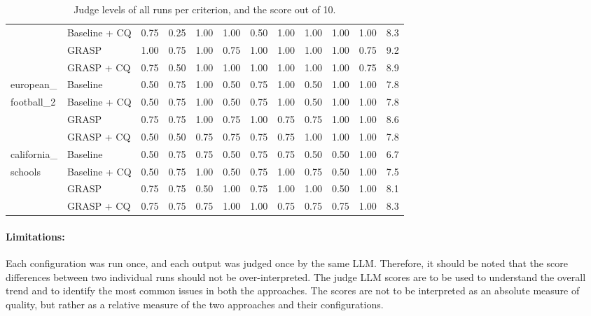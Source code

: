 \begin{table}[!htbp]
\begin{tabular}{l l c c c c c c c c c c}
               & Baseline + CQ & 0.75 & 0.25 & 1.00 & 1.00 & 0.50 & 1.00 & 1.00 & 1.00 & 1.00 & 8.3 \\
               & GRASP         & 1.00 & 0.75 & 1.00 & 0.75 & 1.00 & 1.00 & 1.00 & 1.00 & 0.75 & 9.2 \\
               & GRASP + CQ    & 0.75 & 0.50 & 1.00 & 1.00 & 1.00 & 1.00 & 1.00 & 1.00 & 0.75 & 8.9 \\
    \hline
    european\_  & Baseline      & 0.50 & 0.75 & 1.00 & 0.50 & 0.75 & 1.00 & 0.50 & 1.00 & 1.00 & 7.8 \\
    football\_2 & Baseline + CQ & 0.50 & 0.75 & 1.00 & 0.50 & 0.75 & 1.00 & 0.50 & 1.00 & 1.00 & 7.8 \\
               & GRASP         & 0.75 & 0.75 & 1.00 & 0.75 & 1.00 & 0.75 & 0.75 & 1.00 & 1.00 & 8.6 \\
               & GRASP + CQ    & 0.50 & 0.50 & 0.75 & 0.75 & 0.75 & 0.75 & 1.00 & 1.00 & 1.00 & 7.8 \\
    \hline
    california\_ & Baseline      & 0.50 & 0.75 & 0.75 & 0.50 & 0.75 & 0.75 & 0.50 & 0.50 & 1.00 & 6.7 \\
    schools    & Baseline + CQ & 0.50 & 0.75 & 1.00 & 0.50 & 0.75 & 1.00 & 0.75 & 0.50 & 1.00 & 7.5 \\
               & GRASP         & 0.75 & 0.75 & 0.50 & 1.00 & 0.75 & 1.00 & 1.00 & 0.50 & 1.00 & 8.1 \\
               & GRASP + CQ    & 0.75 & 0.75 & 0.75 & 1.00 & 1.00 & 0.75 & 0.75 & 0.75 & 1.00 & 8.3 \\
    \hline
  \end{tabular}
  \caption[Judge levels of all runs]{Judge levels of all runs per criterion, and the score out of 10.}
  \label{tab:judge-all}
\end{table}

\paragraph{Limitations:}
 Each configuration was run once, and each output was judged once by the same LLM. Therefore, it should be noted that the score differences between two individual runs should not be over-interpreted. The judge LLM scores are to be used to understand the overall trend and to identify the most common issues in both the approaches. The scores are not to be interpreted as an absolute measure of quality, but rather as a relative measure of the two approaches and their configurations.

